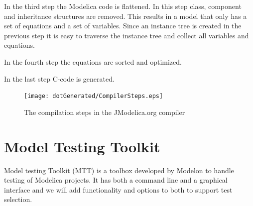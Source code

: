 \documentclass{cslthse-msc}
\begin{document}
In the third step the Modelica code is flattened. In this step class, component and inheritance structures are removed. This results in a model that only has a set of equations and a set of variables. Since an instance tree is created in the previous step it is easy to traverse the instance tree and collect all variables and equations.

In the fourth step the equations are sorted and optimized.

In the last step C-code is generated.

\begin{figure}[!htbp]
    \centering
    {\texttt{[image: dotGenerated/CompilerSteps.eps]}}
    \caption{The compilation steps in the JModelica.org compiler}
    \label{fig:compilerSteps}
\end{figure}

\section{Model Testing Toolkit}
Model testing Toolkit (MTT) is a toolbox developed by Modelon to handle testing of Modelica projects. \cite{modelon.comMTT}It has both a command line and a graphical interface and we will add functionality and options to both to support test selection.
\end{document}
